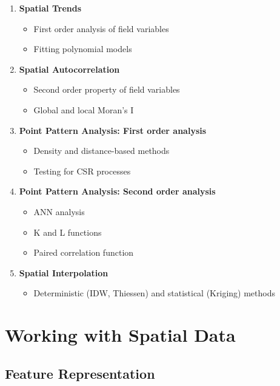 \documentclass[
  letterpaper,
]{book}
\providecommand{\tightlist}{%
  \setlength{\itemsep}{0pt}\setlength{\parskip}{0pt}}
\begin{document}
\begin{enumerate}
\def\labelenumi{\arabic{enumi}.}
\setcounter{enumi}{11}
\tightlist
\item
  \textbf{Spatial Trends}

  \begin{itemize}
  \tightlist
  \item
    First order analysis of field variables
  \item
    Fitting polynomial models
  \end{itemize}
\item
  \textbf{Spatial Autocorrelation}

  \begin{itemize}
  \tightlist
  \item
    Second order property of field variables
  \item
    Global and local Moran's I
  \end{itemize}
\item
  \textbf{Point Pattern Analysis: First order analysis}

  \begin{itemize}
  \tightlist
  \item
    Density and distance-based methods
  \item
    Testing for CSR processes
  \end{itemize}
\item
  \textbf{Point Pattern Analysis: Second order analysis}

  \begin{itemize}
  \tightlist
  \item
    ANN analysis
  \item
    K and L functions
  \item
    Paired correlation function
  \end{itemize}
\item
  \textbf{Spatial Interpolation}

  \begin{itemize}
  \tightlist
  \item
    Deterministic (IDW, Thiessen) and statistical (Kriging) methods
  \end{itemize}
\end{enumerate}

\part{Working with Spatial Data}

\chapter{Feature Representation}\label{feature-representation}
\end{document}

